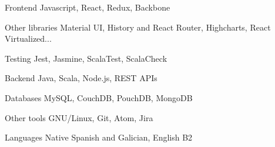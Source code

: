 


\begin{cvskills}


\cvskill
{Frontend} %
{Javascript, React, Redux, Backbone} %


\cvskill
{Other libraries} %
{Material UI, History and React Router, Highcharts, React Virtualized...}


\cvskill
{Testing} %
{Jest, Jasmine, ScalaTest, ScalaCheck} %


\cvskill
{Backend} %
{Java, Scala, Node.js, REST APIs} %



\cvskill
{Databases} %
{MySQL, CouchDB, PouchDB, MongoDB} %


\cvskill
{Other tools} %
{GNU/Linux, Git, Atom, Jira} %


\cvskill
{Languages} %
{Native Spanish and Galician, English B2} %


\end{cvskills}